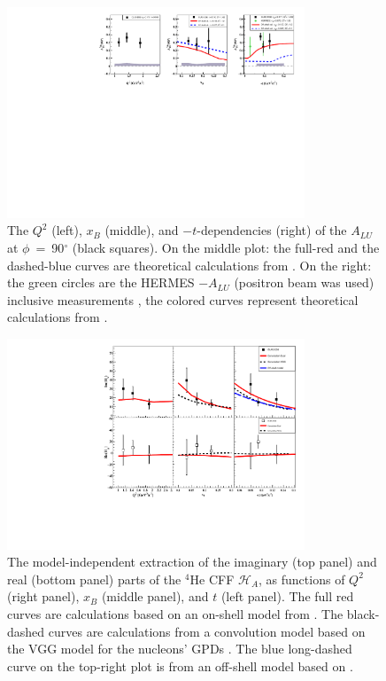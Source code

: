 \documentclass[twocolumn,nofootinbib,showpacs,prl,superscriptaddress,secnumarabic,amssymb,nobibnotes,aps,floatfix]{revtex4}
\begin{document}
\begin{figure}[tb]
\includegraphics[width=8.9cm]{figs/coherent-ALU_90.pdf}
\caption{The $Q^{2}$ (left), $x_{B}$ (middle), and $-t$-dependencies (right) of
   the $A_{LU}$ at $\phi$~=~90$^{\circ}$ (black squares). On the 
   middle plot: the full-red and the dashed-blue curves are theoretical 
   calculations from \cite{simonetta_2}. On the right: the green circles are 
   the HERMES $-A_{LU}$ (positron beam was used) inclusive measurements 
   \cite{Airapetian}, the colored curves represent theoretical calculations 
   from \cite{simonetta_2}.}
\label{fig:alu90}
\end{figure}


\begin{figure}[tb]
\includegraphics[width=8.9cm]{figs/Coherent_CFF.pdf}
\caption{The model-independent extraction of the imaginary (top panel) and
real (bottom panel) parts of the $^4$He CFF $\mathcal{H}_A$, as functions of
$Q^{2}$ (right panel), $x_B$ (middle panel), and $t$ (left panel). The full red 
curves are calculations based on an on-shell model from
\cite{Vadim_priv}. The black-dashed curves are calculations from a convolution 
model based on the VGG model for the nucleons' GPDs \cite{Guidal_priv}. The 
blue long-dashed curve on the top-right plot is from
an off-shell model based on \cite{GonzalezHernandez:2012jv}.}
\label{fig:CFF_HA}
\end{figure}
\end{document}
